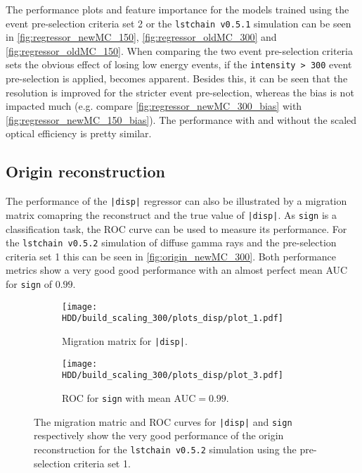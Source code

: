 The performance plots and feature importance for the models trained using the event pre-selection criteria set 2 or the \texttt{lstchain v0.5.1} simulation 
can be seen in \autoref{fig:regressor_newMC_150}, \autoref{fig:regressor_oldMC_300} and \autoref{fig:regressor_oldMC_150}.
When comparing the two event pre-selection criteria sets the obvious effect of losing low energy events, if the \texttt{intensity > 300} event pre-selection is applied, becomes apparent.
Besides this, it can be seen that the resolution is improved for the stricter event pre-selection, whereas the bias is not impacted much 
(e.g. compare \autoref{fig:regressor_newMC_300_bias} with \autoref{fig:regressor_newMC_150_bias}).
The performance with and without the scaled optical efficiency is pretty similar.


\subsection{Origin reconstruction}
The performance of the \texttt{|disp|} regressor can also be illustrated by a migration matrix comapring the reconstruct and the true value of \texttt{|disp|}.
As \texttt{sign} is a classification task, the ROC curve can be used to measure its performance.
For the \texttt{lstchain v0.5.2} simulation of diffuse gamma rays and the pre-selection criteria set 1 this can be seen in \autoref{fig:origin_newMC_300}.
Both performance metrics show a very good good performance with an almost perfect mean AUC for \texttt{sign} of $\num{0.99}$.
\begin{figure}
    \centering
    \begin{subfigure}{0.49\textwidth}
        \centering
        \texttt{[image: HDD/build\_scaling\_300/plots\_disp/plot\_1.pdf]}
        \caption{Migration matrix for \texttt{|disp|}.}
    \end{subfigure}
    \hfill
    \begin{subfigure}{0.49\textwidth}
        \centering
        \texttt{[image: HDD/build\_scaling\_300/plots\_disp/plot\_3.pdf]}
        \caption{ROC for \texttt{sign} with mean AUC$= \num{0.99}$.}    
        \label{fig:origin_newMC_300_roc}  
    \end{subfigure}
    \caption{The migration matric and ROC curves for \texttt{|disp|} and \texttt{sign} respectively show the very good performance of the origin reconstruction
        for the \texttt{lstchain v0.5.2} simulation using the pre-selection criteria set 1.
    }
    \label{fig:origin_newMC_300}
\end{figure}

